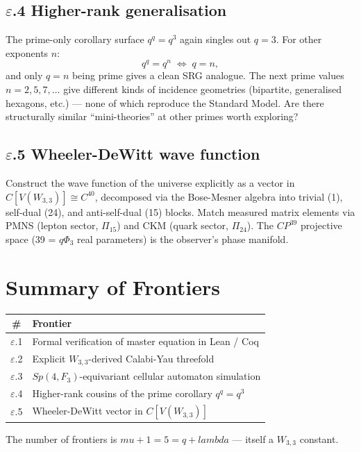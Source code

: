 \documentclass[12pt,a4paper]{article}
\def\mathbb#1{#1}%
\def\mathrm#1{#1}%
\def\lambda{lambda}%
\def\mu{mu}%
\def\Phi#1{Phi#1}%
\theoremstyle{definition}
\newcommand{\Sp}{\mathrm{Sp}}
\newcommand{\FF}{\mathbb{F}}
\newcommand{\CC}{\mathbb{C}}
\begin{document}
\subsection*{$\varepsilon$.4 \quad Higher-rank generalisation}
The prime-only corollary surface $q^q = q^3$ again singles out $q=3$.
For other exponents $n$:
\[
q^q = q^n \;\Longleftrightarrow\; q = n,
\]
and only $q = n$ being prime gives a clean SRG analogue. The next
prime values $n=2, 5, 7, \ldots$ give different kinds of incidence
geometries (bipartite, generalised hexagons, etc.) — none of which
reproduce the Standard Model. Are there structurally similar
``mini-theories'' at other primes worth exploring?

\subsection*{$\varepsilon$.5 \quad Wheeler-DeWitt wave function}
Construct the wave function of the universe explicitly as a vector
in $\CC[V(W_{3,3})] \cong \CC^{40}$, decomposed via the Bose-Mesner
algebra into trivial (1), self-dual (24), and anti-self-dual (15)
blocks. Match measured matrix elements via PMNS (lepton sector,
$\Pi_{15}$) and CKM (quark sector, $\Pi_{24}$). The $\mathbb{CP}^{39}$
projective space (39 = $q\Phi_3$ real parameters) is the observer's
phase manifold.

\section*{Summary of Frontiers}

\begin{center}
\renewcommand{\arraystretch}{1.3}
\begin{tabular}{cl}
\toprule
\# & Frontier \\
\midrule
$\varepsilon$.1 & Formal verification of master equation in Lean / Coq \\
$\varepsilon$.2 & Explicit $W_{3,3}$-derived Calabi-Yau threefold \\
$\varepsilon$.3 & $\Sp(4,\FF_3)$-equivariant cellular automaton simulation \\
$\varepsilon$.4 & Higher-rank cousins of the prime corollary $q^q = q^3$ \\
$\varepsilon$.5 & Wheeler-DeWitt vector in $\CC[V(W_{3,3})]$ \\
\bottomrule
\end{tabular}
\end{center}

The number of frontiers is $\mu+1 = 5 = q+\lambda$ — itself a
$W_{3,3}$ constant.
\end{document}
